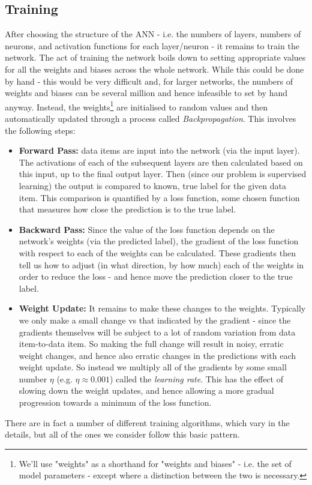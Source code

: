 \documentclass[11pt]{article} %
\theoremstyle{plain}
\theoremstyle{definition}
\begin{document}
\subsection{Training}
After choosing the structure of the ANN - i.e. the numbers of layers, numbers of neurons, and activation functions for each layer/neuron - it remains to train the network. The act of training the network boils down to setting appropriate values for all the weights and biases across the whole network. While this could be done by hand - this would be very difficult and, for larger networks, the numbers of weights and biases can be several million and hence infeasible to set by hand anyway. Instead, the weights\footnote{We'll use "weights" as a shorthand for "weights and biases" - i.e. the set of model parameters - except where a distinction between the two is necessary.} are initialised to random values and then automatically updated through a process called \textit{Backpropagation}. This involves the following steps:
\begin{itemize}
  \item \textbf{Forward Pass:} data items are input into the network (via the input layer). The activations of each of the subsequent layers are then calculated based on this input, up to the final output layer. Then (since our problem is supervised learning) the output is compared to known, true label for the given data item. This comparison is quantified by a loss function, some chosen function that measures how close the prediction is to the true label.   
  \item \textbf{Backward Pass:} Since the value of the loss function depends on the network's weights (via the predicted label), the gradient of the loss function with respect to each of the weights can be calculated. These gradients then tell us how to adjust (in what direction, by how much) each of the weights in order to reduce the loss - and hence move the prediction closer to the true label.
  \item \textbf{Weight Update:} It remains to make these changes to the weights. Typically we only make a small change vs that indicated by the gradient - since the gradients themselves will be subject to a lot of random variation from data item-to-data item. So making the full change will result in noisy, erratic weight changes, and hence also erratic changes in the predictions with each weight update. So instead we multiply all of the gradients by some small number \(\eta\) (e.g. \(\eta\approx0.001\)) called the \textit{learning rate}. This has the effect of slowing down the weight updates, and hence allowing a more gradual progression towards a minimum of the loss function. 
\end{itemize}
There are in fact a number of different training algorithms, which vary in the details, but all of the ones we consider follow this basic pattern.
\end{document}

